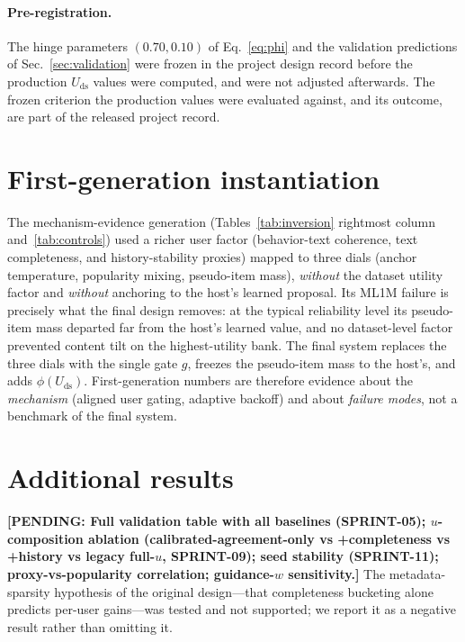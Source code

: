 \documentclass[letterpaper]{article}
\newcommand{\pending}[1]{{\color{red}\textbf{[PENDING: #1]}}}
\newcommand{\Uds}{U_{\mathrm{ds}}}
\newcommand{\phids}{\phi(\Uds)}
\begin{document}
\paragraph{Pre-registration.}
The hinge parameters $(0.70, 0.10)$ of Eq.~\eqref{eq:phi} and the
validation predictions of Sec.~\ref{sec:validation} were frozen in the
project design record before the production $\Uds$ values were
computed, and were not adjusted afterwards. The frozen criterion the
production values were evaluated against, and its outcome, are part of
the released project record.

\section{First-generation instantiation}
\label{app:gen1}

The mechanism-evidence generation (Tables~\ref{tab:inversion}
rightmost column and~\ref{tab:controls}) used a richer user factor
(behavior-text coherence, text completeness, and history-stability
proxies) mapped to three dials (anchor temperature, popularity mixing,
pseudo-item mass), \emph{without} the dataset utility factor and
\emph{without} anchoring to the host's learned proposal. Its ML1M
failure is precisely what the final design removes: at the typical
reliability level its pseudo-item mass departed far from the host's
learned value, and no dataset-level factor prevented content tilt on
the highest-utility bank. The final system replaces the three dials
with the single gate $g$, freezes the pseudo-item mass to the host's,
and adds $\phids$. First-generation numbers are therefore evidence
about the \emph{mechanism} (aligned user gating, adaptive backoff) and
about \emph{failure modes}, not a benchmark of the final system.

\section{Additional results}
\label{app:results}
\pending{Full validation table with all baselines (SPRINT-05);
$u$-composition ablation (calibrated-agreement-only vs +completeness vs
+history vs legacy full-$u$, SPRINT-09); seed stability (SPRINT-11);
proxy-vs-popularity correlation; guidance-$w$ sensitivity.} The
metadata-sparsity hypothesis of the original design---that
completeness bucketing alone predicts per-user gains---was tested and
not supported; we report it as a negative result rather than omitting
it.



% 
\end{document}
